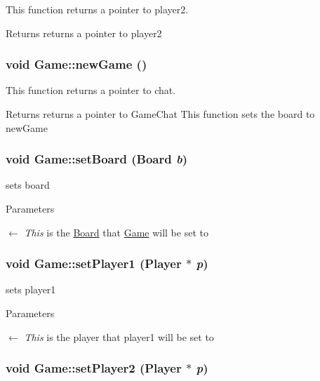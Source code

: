 This function returns a pointer to player2. \begin{DoxyReturn}{Returns}
returns a pointer to player2 
\end{DoxyReturn}
\hypertarget{classGame_a12f32ba70a35a0dcd1f527b4d4a0d2c4}{
\subsubsection[{newGame}]{\setlength{\rightskip}{0pt plus 5cm}void Game::newGame ()}}
\label{classGame_a12f32ba70a35a0dcd1f527b4d4a0d2c4}


This function returns a pointer to chat. \begin{DoxyReturn}{Returns}
returns a pointer to GameChat This function sets the board to newGame 
\end{DoxyReturn}
\hypertarget{classGame_af7023c9a15575e9ecd0ce68b7dfa0900}{
\subsubsection[{setBoard}]{\setlength{\rightskip}{0pt plus 5cm}void Game::setBoard ({\bf Board} {\em b})}}
\label{classGame_af7023c9a15575e9ecd0ce68b7dfa0900}


sets board 
\begin{DoxyParams}{Parameters}
\item[\mbox{$\leftarrow$} {\em This}]is the \hyperlink{classBoard}{Board} that \hyperlink{classGame}{Game} will be set to \end{DoxyParams}
\hypertarget{classGame_a7d45a62dd687fcc5da92399ce4ce38e4}{
\subsubsection[{setPlayer1}]{\setlength{\rightskip}{0pt plus 5cm}void Game::setPlayer1 ({\bf Player} $\ast$ {\em p})}}
\label{classGame_a7d45a62dd687fcc5da92399ce4ce38e4}


sets player1 
\begin{DoxyParams}{Parameters}
\item[\mbox{$\leftarrow$} {\em This}]is the player that player1 will be set to \end{DoxyParams}
\hypertarget{classGame_a4e8f17a058c9444a6257dc2e975b099f}{
\subsubsection[{setPlayer2}]{\setlength{\rightskip}{0pt plus 5cm}void Game::setPlayer2 ({\bf Player} $\ast$ {\em p})}}
\label{classGame_a4e8f17a058c9444a6257dc2e975b099f}


